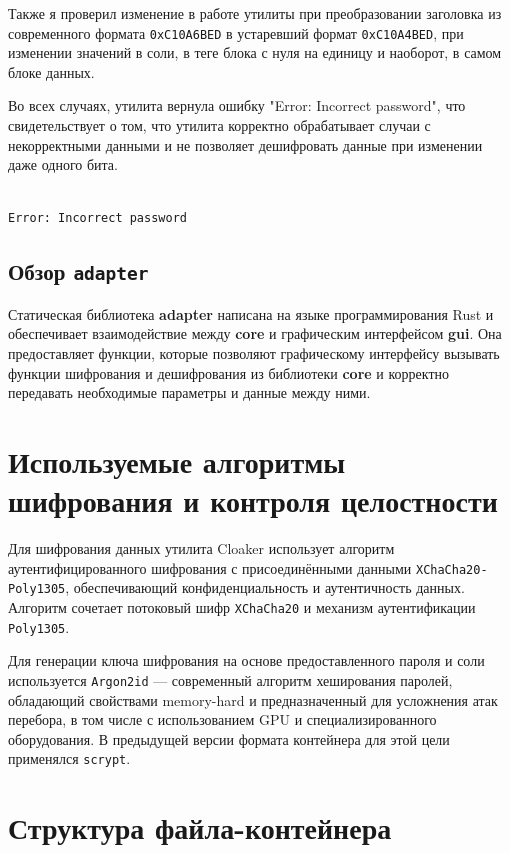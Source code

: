\documentclass[12pt,a4paper]{article}
\begin{document}
Также я проверил изменение в работе утилиты при преобразовании заголовка из современного формата \texttt{0xC10A6BED} в устаревший формат \texttt{0xC10A4BED}, при изменении значений в соли, в теге блока с нуля на единицу и наоборот, в самом блоке данных.

Во всех случаях, утилита вернула ошибку "Error: Incorrect password", что свидетельствует о том, что утилита корректно обрабатывает случаи с некорректными данными и не позволяет дешифровать данные при изменении даже одного бита.

\begin{lstlisting}[language=bash]
% ./cloaker_cli -d file_with_modified_hex_values.cloaker -p "test_password" -o decrypted_file.txt

Error: Incorrect password
\end{lstlisting}

\subsection{Обзор \texttt{adapter}}

Статическая библиотека \textbf{adapter} написана на языке программирования Rust и обеспечивает взаимодействие между \textbf{core} и графическим интерфейсом \textbf{gui}. Она предоставляет функции, которые позволяют графическому интерфейсу вызывать функции шифрования и дешифрования из библиотеки \textbf{core} и корректно передавать необходимые параметры и данные между ними.

\newpage
\section{Используемые алгоритмы шифрования и контроля целостности}

Для шифрования данных утилита Cloaker использует алгоритм аутентифицированного шифрования с присоединёнными данными \texttt{XChaCha20-Poly1305}, обеспечивающий конфиденциальность и аутентичность данных. Алгоритм сочетает потоковый шифр \texttt{XChaCha20} и механизм аутентификации \texttt{Poly1305}.

Для генерации ключа шифрования на основе предоставленного пароля и соли используется \texttt{Argon2id} --- современный алгоритм хеширования паролей, обладающий свойствами memory-hard и предназначенный для усложнения атак перебора, в том числе с использованием GPU и специализированного оборудования. В предыдущей версии формата контейнера для этой цели применялся \texttt{scrypt}.

\section{Структура файла-контейнера}
\end{document}
